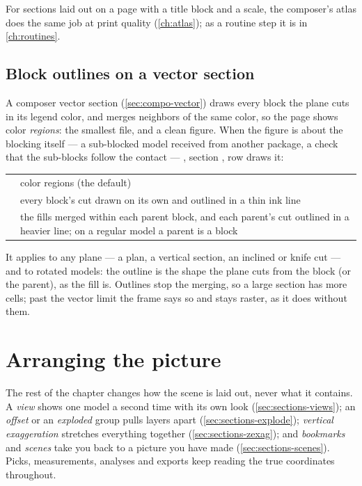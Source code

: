 For sections laid out on a page with a title block and a scale, the composer's atlas does the same job at print quality (\cref{ch:atlas}); as a routine step it is in \cref{ch:routines}.

\subsection{Block outlines on a vector section}\label{sec:sections-outlines}
A composer vector section (\cref{sec:compo-vector}) draws every block the plane cuts in its legend color, and merges neighbors of the same color, so the page shows color \emph{regions}: the smallest file, and a clean figure. When the figure is about the blocking itself — a sub-blocked model received from another package, a check that the sub-blocks follow the contact — , section , row  draws it:

\begin{center}
\begin{tabularx}{\linewidth}{@{}lL@{}}\toprule
{} & color regions (the default) \\
 & every block's cut drawn on its own and outlined in a thin ink line \\
 & the fills merged within each parent block, and each parent's cut outlined in a heavier line; on a regular model a parent is a block \\ \bottomrule
\end{tabularx}
\end{center}

It applies to any plane — a plan, a vertical section, an inclined or knife cut — and to rotated models: the outline is the shape the plane cuts from the block (or the parent), as the fill is. Outlines stop the merging, so a large section has more cells; past the vector limit the frame says so and stays raster, as it does without them.

\section{Arranging the picture}\label{sec:sections-arrange}
The rest of the chapter changes how the scene is laid out, never what it contains. A \emph{view} shows one model a second time with its own look (\cref{sec:sections-views}); an \emph{offset} or an \emph{exploded} group pulls layers apart (\cref{sec:sections-explode}); \emph{vertical exaggeration} stretches everything together (\cref{sec:sections-zexag}); and \emph{bookmarks} and \emph{scenes} take you back to a picture you have made (\cref{sec:sections-scenes}). Picks, measurements, analyses and exports keep reading the true coordinates throughout.

